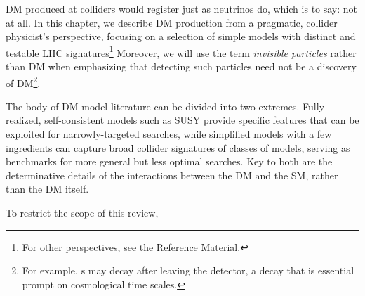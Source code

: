 DM produced at colliders would register just as neutrinos do, which is to say: not at all. 
In this chapter, we describe DM production from a pragmatic, collider physicist's perspective, focusing on a selection of simple models with distinct and testable LHC signatures\footnote{For other perspectives, see the Reference Material.} 
Moreover, we will use the term {\it invisible particles} rather than DM when emphasizing that detecting such particles need not be a discovery of DM\footnote{For example, {\IP}s may decay after leaving the detector, a decay that is essential prompt on cosmological time scales.}.


The body of DM model literature can be divided into two extremes. %
Fully-realized, self-consistent models such as SUSY provide specific features that can be exploited for narrowly-targeted searches, while simplified models with a few ingredients can capture broad collider signatures of classes of models, serving as benchmarks for more general but less optimal searches.
Key to both are the determinative details of the interactions between the DM and the SM, rather than the DM itself.


To restrict the scope of this review,


